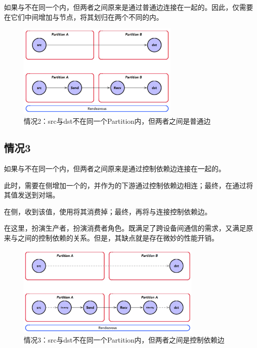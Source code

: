 \begin{content}
如果与不在同一个内，但两者之间原来是通过普通边连接在一起的。因此，仅需要在它们中间增加与节点，将其划归在两个不同的内。

\begin{figure}[H]
\centering
\includegraphics[width=0.7\textwidth]{figures/split-graph-2.png}
\caption{情况2：src与dst不在同一个Partition内，但两者之间是普通边}
 \label{fig:split-graph-2}
\end{figure}

\subsection{情况3}

如果与不在同一个内，但两者之间原来是通过控制依赖边连接在一起的。

此时，需要在侧增加一个的，并作为的下游通过控制依赖边相连；最终，在通过将其值发送到对端。

在侧，收到该值，使用将其消费掉；最终，再将与连接控制依赖边。

在这里，扮演生产者，扮演消费者角色。既满足了跨设备间通信的需求，又满足原来与之间的控制依赖的关系。但是，其缺点就是存在微妙的性能开销。

\begin{figure}[H]
\centering
\includegraphics[width=0.8\textwidth]{figures/split-graph-3.png}
\caption{情况3：src与dst不在同一个Partition内，但两者之间是控制依赖边}
 \label{fig:split-graph-3}
\end{figure}


\end{content}

